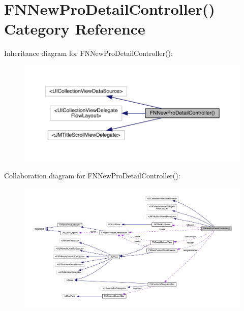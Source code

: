 \hypertarget{category_f_n_new_pro_detail_controller_07_08}{}\section{F\+N\+New\+Pro\+Detail\+Controller() Category Reference}
\label{category_f_n_new_pro_detail_controller_07_08}


Inheritance diagram for F\+N\+New\+Pro\+Detail\+Controller()\+:\nopagebreak
\begin{figure}[H]
\begin{center}
\leavevmode
\includegraphics[width=350pt]{category_f_n_new_pro_detail_controller_07_08__inherit__graph}
\end{center}
\end{figure}


Collaboration diagram for F\+N\+New\+Pro\+Detail\+Controller()\+:\nopagebreak
\begin{figure}[H]
\begin{center}
\leavevmode
\includegraphics[width=350pt]{category_f_n_new_pro_detail_controller_07_08__coll__graph}
\end{center}
\end{figure}
